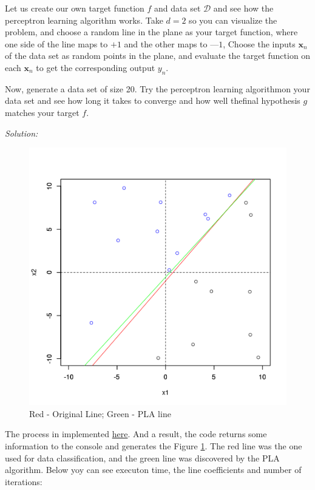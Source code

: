 \documentclass[12pt,letterpaper]{article}
\newcommand{\bx}{\boldsymbol{x}}
\begin{document}
		Let  us  create  our  own  target  function  $f$   and  data  set $\mathcal{D}$  and  see  how  the perceptron  learning  algorithm  works.  Take $d = 2$ so  you  can  visualize  the problem,  and  choose  a  random  line  in  the  plane  as  your  target  function, where one side of the  line  maps to $+1$  and  the other  maps to $—1$,  Choose the  inputs $\bx_n$  of the data  set  as  random  points  in  the  plane,  and  evaluate the target  function  on  each $\bx_n$ to get the corresponding output $y_n$.
		
		 Now, generate a  data  set of size 20.  Try the perceptron  learning algorithmon  your  data  set  and  see  how  long  it  takes  to  converge  and  how  well  thefinal  hypothesis $g$  matches your target  $f$.  
		 
		 \textit{Solution:} 
		 \begin{figure}[!htb]
		 	\centering
		 	\label{pla}
		 	\includegraphics[scale=0.75]{figs/ex1.4_PLA.png}
		 	\caption{Red - Original Line; Green - PLA line}
		 \end{figure} 
	 
		 The process in implemented \href{https://github.com/reneroliveira/Machine_Learning/blob/main/Exercises/PLA_algorithm.R}{here}. And a result, the code returns some information to the console and generates the Figure \ref{pla}. The red line was the one used for data classification, and the green line was discovered by the PLA algorithm. Below yoy can see executon time, the line coefficients and number of iterations:
		 
\end{document}

